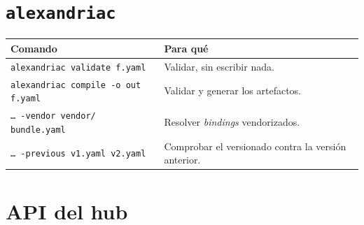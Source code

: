 \section{\texttt{alexandriac}}

\noindent\begin{tabularx}{\linewidth}{@{}L{9cm}Y@{}}
\toprule
\textbf{Comando} & \textbf{Para qué} \\
\midrule
\texttt{alexandriac validate f.yaml} & Validar, sin escribir nada. \\
\texttt{alexandriac compile -o out f.yaml} & Validar y generar los artefactos. \\
\texttt{… -vendor vendor/\allowbreak{} bundle.yaml} & Resolver \emph{bindings} vendorizados. \\
\texttt{… -previous v1.yaml v2.yaml} & Comprobar el versionado contra la versión anterior. \\
\bottomrule
\end{tabularx}

\section{API del hub}

